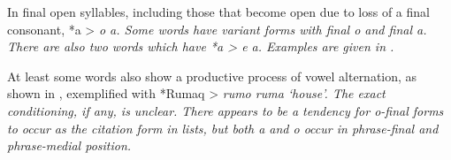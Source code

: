 In final open syllables,
including those that become open due to loss of a final consonant,
*a > \it{o {\tl} a}.
Some words have variant forms with final \it{o} and final \it{a}.
There are also two words which have *a > \it{e {\tl} a.} Examples
are given in .


At least some words also show a productive process of vowel alternation,
as shown in ,
exemplified with *Rumaq > \it{rumo {\tl} ruma} ‘house’.
The exact conditioning, if any, is unclear.
There appears to be a tendency for \it{o}-final forms to occur
as the citation form in lists,
but both \it{a} and \it{o} occur in phrase-final
and phrase-medial position.

